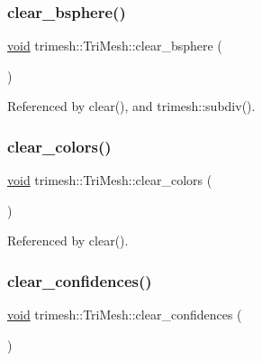\subsubsection{\texorpdfstring{clear\+\_\+bsphere()}{clear\_bsphere()}}
{\footnotesize\ttfamily \hyperlink{namespacetrimesh_a784ddfd979e1c579bda795a8edfc3f43}{void} trimesh\+::\+Tri\+Mesh\+::clear\+\_\+bsphere (\begin{DoxyParamCaption}{ }\end{DoxyParamCaption})\hspace{0.3cm}{\ttfamily [inline]}}



Referenced by clear(), and trimesh\+::subdiv().

\mbox{\label{classtrimesh_1_1TriMesh_a30c58a07d2f89cb7b3af7d3651600757}} 
\subsubsection{\texorpdfstring{clear\+\_\+colors()}{clear\_colors()}}
{\footnotesize\ttfamily \hyperlink{namespacetrimesh_a784ddfd979e1c579bda795a8edfc3f43}{void} trimesh\+::\+Tri\+Mesh\+::clear\+\_\+colors (\begin{DoxyParamCaption}{ }\end{DoxyParamCaption})\hspace{0.3cm}{\ttfamily [inline]}}



Referenced by clear().

\mbox{\label{classtrimesh_1_1TriMesh_aa5f9b74aab0c7163581110c6a4f98e16}} 
\subsubsection{\texorpdfstring{clear\+\_\+confidences()}{clear\_confidences()}}
{\footnotesize\ttfamily \hyperlink{namespacetrimesh_a784ddfd979e1c579bda795a8edfc3f43}{void} trimesh\+::\+Tri\+Mesh\+::clear\+\_\+confidences (\begin{DoxyParamCaption}{ }\end{DoxyParamCaption})\hspace{0.3cm}{\ttfamily [inline]}}



